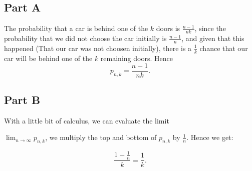 \documentclass[12pt]{article}
\begin{document}
\subsection*{Part A}

The probability that a car is behind one of the $k$ doors is $\frac{n-1}{nk}$, since the probability that we did not choose the car initially is $\frac{n-1}{n}$, and given that this happened (That our car was not choosen initially), there is a $\frac{1}{k}$ chance that our car will be behind one of the $k$ remaining doors. Hence
\[
p_{n,k} = \frac{n-1}{nk}.
\]

\subsection*{Part B}
With a little bit of calculus, we can evaluate the limit 

$\lim_{n \rightarrow \infty} p_{n,k}$, we multiply the top and bottom of $p_{n,k}$ by $\frac{1}{n}$. Hence we get:

\[
\frac{1-\frac{1}{n}}{k} = \frac{1}{k}.
\]
\end{document}
